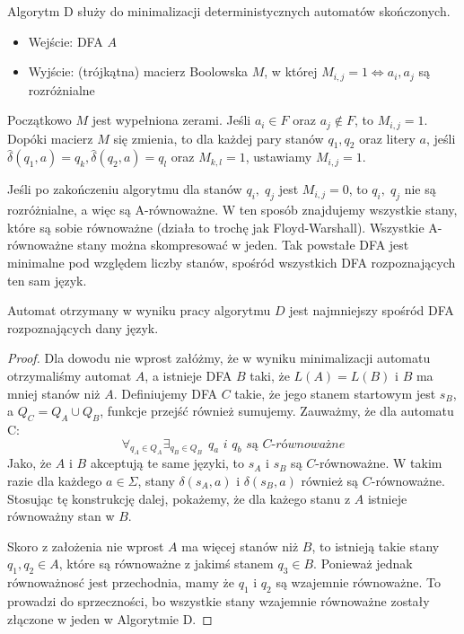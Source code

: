 Algorytm D służy do minimalizacji deterministycznych automatów skończonych.

\begin{itemize}
    \item Wejście: DFA \( A \)
    \item Wyjście: (trójkątna) macierz Boolowska \( M \), w której \( M_{i, j} = 1 \iff a_i, a_j \) są rozróżnialne
\end{itemize}

Początkowo \( M \) jest wypełniona zerami.
Jeśli \( a_i \in F \) oraz \( a_j \notin F \), to \( M_{i, j} = 1 \).
Dopóki macierz \( M \) się zmienia, to dla każdej pary stanów \( q_1, q_2 \) oraz litery \( a \), jeśli \( \hat \delta(q_1, a) = q_k, \hat \delta(q_2, a) = q_l \) oraz \( M_{k, l} = 1 \), ustawiamy \( M_{i, j} = 1 \).

Jeśli po zakończeniu algorytmu dla stanów \(q_i,\; q_j\) jest \(M_{i,j} = 0\), to \(q_i,\; q_j\) nie są rozróżnialne, a więc są A-równoważne. W ten sposób znajdujemy wszystkie stany, które są sobie równoważne (działa to trochę jak Floyd-Warshall).
Wszystkie A-równoważne stany można skompresować w jeden. Tak powstałe DFA jest minimalne pod względem liczby stanów, spośród wszystkich DFA rozpoznających ten sam język. 

\begin{theorem}
    Automat otrzymany w wyniku pracy algorytmu \(D\) jest najmniejszy spośród DFA rozpoznających dany język.
\end{theorem}
\begin{proof}
    Dla dowodu nie wprost załóżmy, że w wyniku minimalizacji automatu otrzymaliśmy automat \(A\), a istnieje DFA \(B\) taki, że \( L(A) = L(B) \) i \(B\) ma mniej stanów niż \(A\).
    Definiujemy DFA \(C\) takie, że jego stanem startowym jest \(s_B\), a \(Q_C = Q_A \cup Q_B\), funkcje przejść również sumujemy. Zauważmy, że dla automatu C:
    \[
        \forall_{q_A \in Q_A} \exists_{q_B \in Q_B}  \hspace{5pt} \textit{\(q_a\) i \(q_b\) są \(C\)-równoważne}
    \]
    Jako, że \(A\) i \(B\) akceptują te same języki, to \(s_A\) i \(s_B\) są \(C\)-równoważne. W takim razie dla każdego \(a \in \Sigma\), stany \(\delta(s_A, a)\) i \(\delta(s_B, a)\) również są \(C\)-równoważne. Stosując tę konstrukcję dalej, pokażemy, że dla każego stanu z \(A\) istnieje równoważny stan w \(B\). 
    
    Skoro z założenia nie wprost \(A\) ma więcej stanów niż \(B\), to istnieją takie stany \(q_1, q_2 \in A\), które są równoważne z jakimś stanem \(q_3 \in B\). Ponieważ jednak równoważnosć jest przechodnia, mamy że \(q_1\) i \(q_2\) są wzajemnie równoważne.
    To prowadzi do sprzeczności, bo wszystkie stany wzajemnie równoważne zostały złączone w jeden w Algorytmie D.
\end{proof}